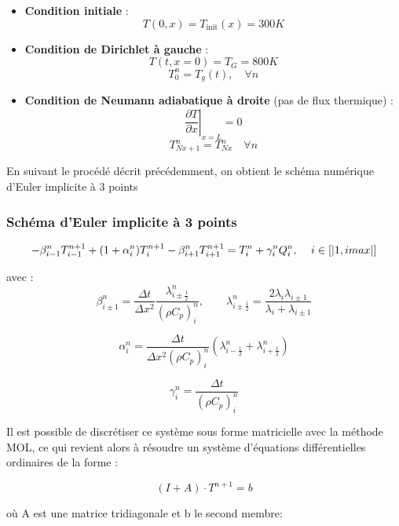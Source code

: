 \documentclass[a4paper,11pt]{article}
\begin{document}
\begin{itemize}
    \item \textbf{Condition initiale} : 
    \[
    T(0,x) = T_{\text{init}}(x) = 300 K
    \]

    \item \textbf{Condition de Dirichlet à gauche} : 
    \[
    T(t, x=0) = T_G = 800 K
    \]
    \[
    T_0^n = T_g(t),\quad  \forall n
    \]


    \item \textbf{Condition de Neumann adiabatique à droite} (pas de flux thermique) :
    \[
    \left. \frac{\partial T}{\partial x} \right|_{x = L} = 0 
    \]
    \[
    T_{Nx+1}^n = T_{Nx}^n \quad \forall n  
    \]
\end{itemize}

En suivant le procédé décrit précédemment, on obtient le schéma numérique d'Euler implicite à 3 points
\subsubsection*{Schéma d'Euler implicite à 3 points}
\begin{equation}
    \large
    - \beta_{i-1}^{n} T_{i-1}^{n+1} + (1 + \alpha_i^n) T_i^{n+1} - \beta_{i+1}^{n} T_{i+1}^{n+1} = T_i^n + \gamma_i^n Q_i^n, \quad i \in [|1, imax|]
\end{equation}

avec :
\[
\beta_{i \pm 1}^{n} = \frac{\Delta t}{\Delta x^2} \frac{\lambda_{i \pm \frac{1}{2}}^n}{(\rho C_p)_i^n}, \quad \quad\lambda_{i \pm \frac{1}{2}}^n = \frac{2\lambda_i \lambda_{i\pm1}}{\lambda_{i}+\lambda_{i\pm1}}
\]

\[
\alpha_i^n = \frac{\Delta t}{\Delta x^2 (\rho C_p)_i^n} \left( \lambda_{i - \frac{1}{2}}^n + \lambda_{i + \frac{1}{2}}^n \right)
\]

\[
\gamma_i^n = \frac{\Delta t}{(\rho C_p)_i^n}
\]

Il est possible de discrétiser ce système sous forme matricielle avec la méthode MOL, ce qui revient alors à résoudre un système d'équations différentielles ordinaires de la forme :

\begin{equation}
    (I + A) \cdot T^{n+1} = b
\end{equation}

où A est une matrice tridiagonale et b le second membre:
\end{document}
